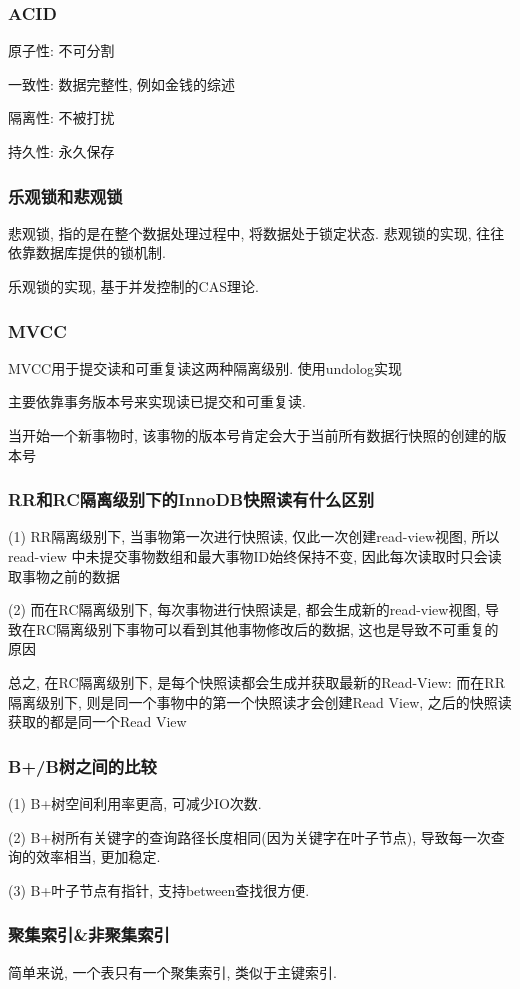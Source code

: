 \documentclass[UTF8]{ctexart}
\begin{document}
\subsubsection{ACID}
原子性: 不可分割
\par
一致性: 数据完整性, 例如金钱的综述
\par
隔离性: 不被打扰
\par
持久性: 永久保存
\subsubsection{乐观锁和悲观锁}
悲观锁, 指的是在整个数据处理过程中, 将数据处于锁定状态. 悲观锁的实现, 往往依靠数据库提供的锁机制.
\par
乐观锁的实现, 基于并发控制的CAS理论.
\subsubsection{MVCC}
MVCC用于提交读和可重复读这两种隔离级别. 使用undolog实现
\par
主要依靠事务版本号来实现读已提交和可重复读.
\par
当开始一个新事物时, 该事物的版本号肯定会大于当前所有数据行快照的创建的版本号
\subsubsection{RR和RC隔离级别下的InnoDB快照读有什么区别}
(1) RR隔离级别下, 当事物第一次进行快照读, 仅此一次创建read-view视图, 所以read-view
中未提交事物数组和最大事物ID始终保持不变, 因此每次读取时只会读取事物之前的数据 \par
(2) 而在RC隔离级别下, 每次事物进行快照读是, 都会生成新的read-view视图, 导致在RC隔离级别下事物可以看到其他事物修改后的数据, 这也是导致不可重复的原因 \par
总之, 在RC隔离级别下, 是每个快照读都会生成并获取最新的Read-View: 而在RR隔离级别下, 则是同一个事物中的第一个快照读才会创建Read View, 之后的快照读获取的都是同一个Read View \par
\subsubsection{B+/B树之间的比较}
(1) B+树空间利用率更高, 可减少IO次数. \par
(2) B+树所有关键字的查询路径长度相同(因为关键字在叶子节点), 导致每一次查询的效率相当, 更加稳定. \par
(3) B+叶子节点有指针, 支持between查找很方便.
\subsubsection{聚集索引\&非聚集索引}
简单来说, 一个表只有一个聚集索引, 类似于主键索引.
\end{document}
